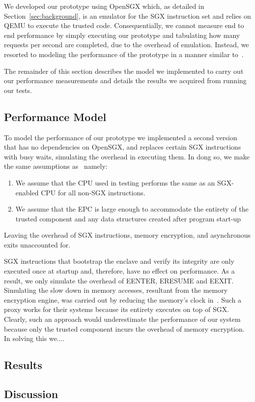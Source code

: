\documentclass[../main.tex]{subfiles}
\begin{document}
We developed our prototype using OpenSGX which, as detailed in
Section~\ref{sec:background}, is an emulator for the SGX instruction set and
relies on QEMU to execute the trusted code. Consequentially, we cannot measure
end to end performance by simply executing our prototype and tabulating how
many requests per second are completed, due to the overhead of emulation.
Instead, we resorted to modeling the performance of the prototype in a manner
similar to~\cite{Baumann14}.

The remainder of this section describes the model we implemented to carry out
our performance measurements and details the results we acquired from running
our tests.
\subsection{Performance Model}
To model the performance of our prototype we implemented a second version
that has no dependencies on OpenSGX, and replaces certain SGX instructions with busy waits, simulating the overhead in executing them. In dong so, we make the same assumptions as~\cite{Baumann14} namely: 
	\begin{enumerate}
		\item We assume that the CPU used in testing performs the same as an SGX-enabled CPU for all non-SGX instructions.
		\item We assume that the EPC is large enough to accommodate the entirety of the trusted component and any data structures created after program start-up 
	\end{enumerate}
Leaving the overhead of SGX instructions, memory encryption, and asynchronous exits unaccounted for. 

SGX instructions that bootstrap the enclave and verify its integrity are only executed once at startup and, therefore, have no effect on performance. As a result, we only simulate the overhead of EENTER, ERESUME and EEXIT. Simulating 
the slow down in memory accesses, resultant from the memory encryption engine, was carried out by reducing the memory's clock in~\cite{Baumann14}. Such a proxy works for their systems because its entirety executes on top of SGX. Clearly, such an approach would underestimate the performance of our system because only the trusted component incurs the overhead of memory encryption.
In solving this we....%

\subsection{Results}
\subsection{Discussion}
\end{document}
